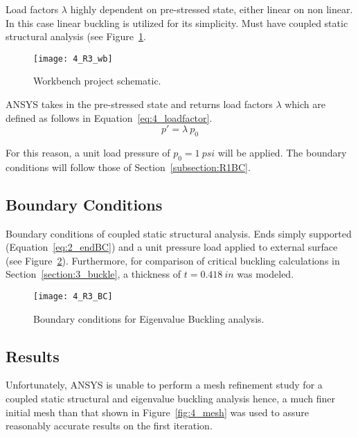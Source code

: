 Load factors $\lambda$ highly dependent on pre-stressed state, either linear on non linear.\\

In this case linear buckling is utilized for its simplicity. Must have coupled static structural analysis (see Figure~\ref{fig:4_R3_wb}.

\begin{figure}[H]
	\centering
	\texttt{[image: 4\_R3\_wb]}
	\caption{Workbench project schematic.}
	\label{fig:4_R3_wb}
\end{figure}

ANSYS takes in the pre-stressed state and returns load factors $\lambda$ which are defined as follows in Equation~\ref{eq:4_loadfactor}.
\begin{equation}
	\label{eq:4_loadfactor}
	p' = \lambda \ p_0
\end{equation}

For this reason, a unit load pressure of $p_0 = 1\ psi$ will be applied. The boundary conditions will follow those of Section~\ref{subsection:R1BC}.

\subsection{Boundary Conditions}

Boundary conditions of coupled static structural analysis. Ends simply supported (Equation~\ref{eq:2_endBC}) and a unit pressure load applied to external surface (see Figure~\ref{fig:4_R3_BC}). Furthermore, for comparison of critical buckling calculations in Section~\ref{section:3_buckle}, a thickness of $t=0.418\ in$ was modeled. 

\begin{figure}[H]
	\centering
	\texttt{[image: 4\_R3\_BC]}
	\caption{Boundary conditions for Eigenvalue Buckling analysis.}
	\label{fig:4_R3_BC}
\end{figure}

\subsection{Results}

Unfortunately, ANSYS is unable to perform a mesh refinement study for a coupled static structural and eigenvalue buckling analysis hence, a much finer initial mesh than that shown in Figure~\ref{fig:4_mesh} was used to assure reasonably accurate results on the first iteration.\\

